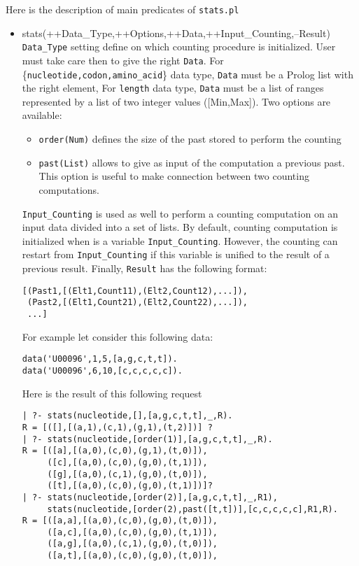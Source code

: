 \documentclass{book}
\begin{document}
Here is the description of main predicates of \texttt{stats.pl}
\begin{itemize}
\item stats(++Data\_Type,++Options,++Data,++Input\_Counting,--Result) \\
\texttt{Data\_Type} setting define on which counting procedure is initialized. User must take care then
to give the right \texttt{Data}. For \{\texttt{nucleotide,codon,amino\_acid}\} data type, 
\texttt{Data} must be a Prolog list with the right element, For \texttt{length} data type,
\texttt{Data} must be a list of ranges represented by a list of two integer values ([Min,Max]).
Two options are available:
\begin{itemize}
\item \texttt{order(Num)} defines the size of the past stored to perform the counting
\item \texttt{past(List)} allows to give as input of the computation a previous past. This option is
useful to make connection between two counting computations.
\end{itemize}
\texttt{Input\_Counting} is used as well to perform a counting computation on an input data divided
into a set of lists. By default, counting computation is initialized when is a variable \texttt{Input\_Counting}.
However, the counting can restart from \texttt{Input\_Counting} if this variable is unified to
the result of a previous result. Finally, \texttt{Result} has the following format:
\begin{verbatim}
[(Past1,[(Elt1,Count11),(Elt2,Count12),...]), 
 (Past2,[(Elt1,Count21),(Elt2,Count22),...]),
 ...]
\end{verbatim}
For example let consider this following data:
\begin{verbatim}
data('U00096',1,5,[a,g,c,t,t]).
data('U00096',6,10,[c,c,c,c,c]).
\end{verbatim}
Here is the result of this following request
\begin{verbatim}
| ?- stats(nucleotide,[],[a,g,c,t,t],_,R).
R = [([],[(a,1),(c,1),(g,1),(t,2)])] ?
| ?- stats(nucleotide,[order(1)],[a,g,c,t,t],_,R).
R = [([a],[(a,0),(c,0),(g,1),(t,0)]),
     ([c],[(a,0),(c,0),(g,0),(t,1)]),
     ([g],[(a,0),(c,1),(g,0),(t,0)]),
     ([t],[(a,0),(c,0),(g,0),(t,1)])]?
| ?- stats(nucleotide,[order(2)],[a,g,c,t,t],_,R1),
     stats(nucleotide,[order(2),past([t,t])],[c,c,c,c,c],R1,R).
R = [([a,a],[(a,0),(c,0),(g,0),(t,0)]),
     ([a,c],[(a,0),(c,0),(g,0),(t,1)]),
     ([a,g],[(a,0),(c,1),(g,0),(t,0)]),
     ([a,t],[(a,0),(c,0),(g,0),(t,0)]),

\end{verbatim}
\end{itemize}
\end{document}
